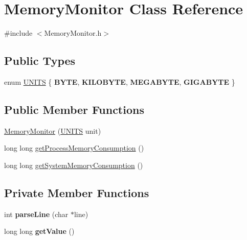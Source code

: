 \hypertarget{class_memory_monitor}{}\section{Memory\+Monitor Class Reference}
\label{class_memory_monitor}


{\ttfamily \#include $<$Memory\+Monitor.\+h$>$}

\subsection*{Public Types}
\begin{DoxyCompactItemize}
\item 
enum \hyperlink{class_memory_monitor_aab7a81fc67c4acdf0d3c4ffefe3ef740}{U\+N\+I\+TS} \{ {\bfseries B\+Y\+TE}, 
{\bfseries K\+I\+L\+O\+B\+Y\+TE}, 
{\bfseries M\+E\+G\+A\+B\+Y\+TE}, 
{\bfseries G\+I\+G\+A\+B\+Y\+TE}
 \}
\end{DoxyCompactItemize}
\subsection*{Public Member Functions}
\begin{DoxyCompactItemize}
\item 
\hyperlink{class_memory_monitor_a03d307d8b56faf99571de9836a74fecf}{Memory\+Monitor} (\hyperlink{class_memory_monitor_aab7a81fc67c4acdf0d3c4ffefe3ef740}{U\+N\+I\+TS} unit)
\item 
long long \hyperlink{class_memory_monitor_ad5661e725b77131a188fb766987321a1}{get\+Process\+Memory\+Consumption} ()
\item 
long long \hyperlink{class_memory_monitor_a2b9ef8cb8113acdded0d6c3170e47cd2}{get\+System\+Memory\+Consumption} ()
\end{DoxyCompactItemize}
\subsection*{Private Member Functions}
\begin{DoxyCompactItemize}
\item 
int {\bfseries parse\+Line} (char $\ast$line)\hypertarget{class_memory_monitor_a3ed92d5612089f555f11e6a49e6f0e7c}{}\label{class_memory_monitor_a3ed92d5612089f555f11e6a49e6f0e7c}

\item 
long long {\bfseries get\+Value} ()\hypertarget{class_memory_monitor_a3311171846147b7c2d4bf2e2253b6db9}{}\label{class_memory_monitor_a3311171846147b7c2d4bf2e2253b6db9}

\end{DoxyCompactItemize}
